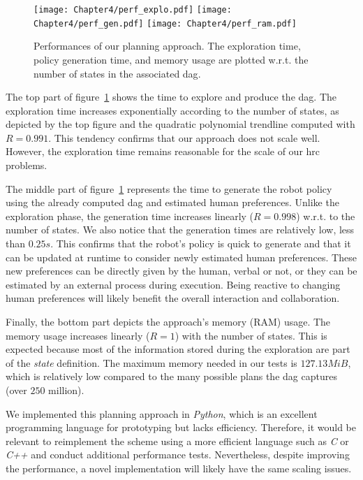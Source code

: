 \begin{figure}[h]
    \center
    \texttt{[image: Chapter4/perf\_explo.pdf]}
    \texttt{[image: Chapter4/perf\_gen.pdf]}
    \texttt{[image: Chapter4/perf\_ram.pdf]}
    \caption{Performances of our planning approach. The exploration time, policy generation time, and memory usage are plotted w.r.t. the number of states in the associated \acrshort{dag}.}
    \label{fig:performances}
\end{figure}

\clearpage

The top part of figure~\ref{fig:performances} shows the time to explore and produce the \acrshort{dag}. The exploration time increases exponentially according to the number of states, as depicted by the top figure and the quadratic polynomial trendline computed with $R = 0.991$. This tendency confirms that our approach does not scale well. However, the exploration time remains reasonable for the scale of our \acrshort{hrc} problems. 

The middle part of figure~\ref{fig:performances} represents the time to generate the robot policy using the already computed \acrshort{dag} and estimated human preferences. Unlike the exploration phase, the generation time increases linearly ($R = 0.998$) w.r.t. to the number of states. We also notice that the generation times are relatively low, less than $0.25s$. This confirms that the robot's policy is quick to generate and that it can be updated at runtime to consider newly estimated human preferences. These new preferences can be directly given by the human, verbal or not, or they can be estimated by an external process during execution. Being reactive to changing human preferences will likely benefit the overall interaction and collaboration.

Finally, the bottom part depicts the approach's memory (RAM) usage. The memory usage increases linearly ($R = 1$) with the number of states. This is expected because most of the information stored during the exploration are part of the \textit{state} definition. The maximum memory needed in our tests is $127.13MiB$, which is relatively low compared to the many possible plans the \acrshort{dag} captures (over $250$ million).

We implemented this planning approach in \textit{Python}, which is an excellent programming language for prototyping but lacks efficiency. Therefore, it would be relevant to reimplement the scheme using a more efficient language such as \textit{C} or \textit{C++} and conduct additional performance tests. Nevertheless, despite improving the performance, a novel implementation will likely have the same scaling issues.

